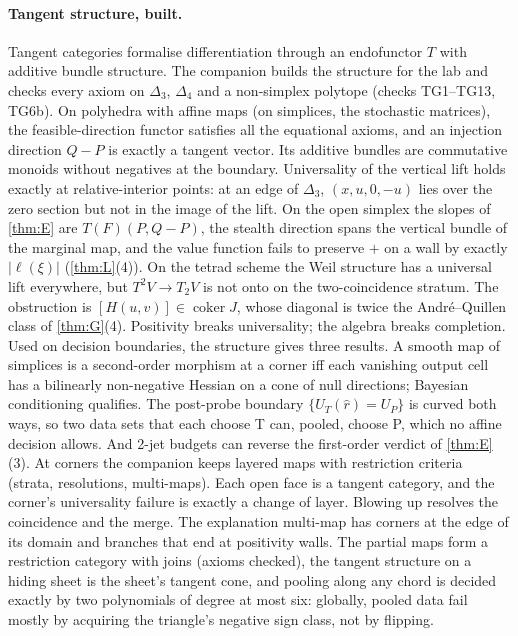 \documentclass[11pt]{article}
\theoremstyle{definition}\newtheorem{definition}{Definition}\newtheorem{remark}{Remark}
\begin{document}
\paragraph{Tangent structure, built.} Tangent categories \cite{CockettCruttwell2014} formalise differentiation through an
endofunctor $T$ with additive bundle structure. The companion \cite{TangentCompanion} builds the structure for the lab and checks every
axiom on $\Delta_3$, $\Delta_4$ and a non-simplex polytope (checks TG1--TG13, TG6b). On polyhedra with affine maps (on simplices, the
stochastic matrices), the feasible-direction functor satisfies all the equational axioms, and an injection direction $Q-P$ is exactly a
tangent vector. Its additive bundles are commutative monoids without negatives at the boundary. Universality of the vertical lift holds
exactly at relative-interior points: at an edge of $\Delta_3$, $(x,u,0,-u)$ lies over the zero section but not in the image of the lift.
On the open simplex the slopes of \cref{thm:E} are $T(F)(P,Q-P)$, the stealth direction spans the vertical bundle of the marginal map,
and the value function fails to preserve $+$ on a wall by exactly $|\ell(\xi)|$ (\cref{thm:L}(4)). On the tetrad scheme the Weil
structure has a universal lift everywhere, but $T^2V\to T_2V$ is not onto on the two-coincidence stratum. The obstruction is
$[H(u,v)]\in\operatorname{coker}J$, whose diagonal is twice the André--Quillen class of \cref{thm:G}(4). Positivity breaks universality;
the algebra breaks completion. Used on decision boundaries, the structure gives three results. A smooth map of simplices is a
second-order morphism at a corner iff each vanishing output cell has a bilinearly non-negative Hessian on a cone of null directions;
Bayesian conditioning qualifies. The post-probe boundary $\{U_T(\hat r)=U_P\}$ is curved both ways, so two data sets that each choose
T can, pooled, choose P, which no affine decision allows. And 2-jet budgets can reverse the first-order verdict of \cref{thm:E}(3). At corners the companion keeps layered maps with
restriction criteria (strata, resolutions, multi-maps). Each open face is a tangent category, and the corner's universality failure is
exactly a change of layer. Blowing up resolves the coincidence and the merge. The explanation multi-map has corners at the edge of its
domain and branches that end at positivity walls. The partial maps form a restriction category with joins (axioms checked), the tangent
structure on a hiding sheet is the sheet's tangent cone, and pooling along any chord is decided exactly by two polynomials of degree
at most six: globally, pooled data fail mostly by acquiring the triangle's negative sign class, not by flipping.
\end{document}

